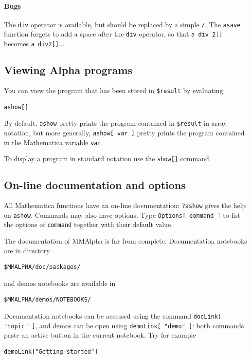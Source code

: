 \documentclass[12pt]{article}
\newcommand{\Alpha}{{\sc Alpha}}
\newcommand{\MMA}{{\sc MMAlpha}}
\newcommand{\MMAlfa}{\MMA}
\newcommand{\mma}{{Mathematica}}
\begin{document}
\paragraph*{Bugs}
The \texttt{div} operator is available, but should be
replaced by a simple \texttt{/}. The \texttt{asave} function 
forgets to add a space after the \texttt{div} operator, so that
\texttt{a div 2[]} becomes \texttt{a div2[]}...

\subsection{Viewing {\Alpha} programs}
You can view the program that has been stored in {\tt \$result} by 
evaluating:
\begin{verbatim}
ashow[]
\end{verbatim}
By default, \texttt{ashow} pretty prints the program contained 
in {\tt \$result} in array notation, but more generally, \texttt{ashow[ var ]}
pretty prints the program contained in the \mma{} variable \texttt{var}.

To display a program in standard notation
use the
\texttt{show[]} command.
\subsection{On-line documentation and options}
All \mma{} functions have an on-line documentation: 
\texttt{?ashow} gives the help on \texttt{ashow}. Commands
may also have options. Type \texttt{Options[ command ]} to list
the options of \texttt{command} together with their default value.

The documentation of \MMAlfa{} is far from complete. 
Documentation notebooks are in directory 
\begin{verbatim}
$MMALPHA/doc/packages/
\end{verbatim}
and demos notebooks are available in 
\begin{verbatim}
$MMALPHA/demos/NOTEBOOKS/
\end{verbatim}
Documentation notebooks can be accessed
using the command \texttt{docLink[ "topic" ]}, and demos
can be open using \texttt{demoLink[ "demo" ]}: both commands
paste an active button in the current notebook. Try 
for example 
\begin{verbatim}
demoLink["Getting-started"]
\end{verbatim}
\end{document}
